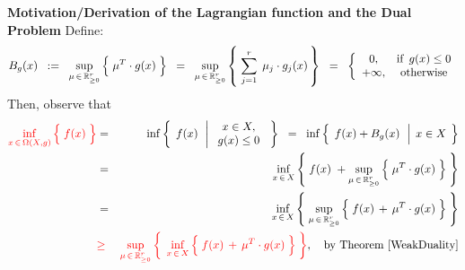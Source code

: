 \vskip 0.3cm
\noindent
\textbf{Motivation/Derivation of the Lagrangian function and the Dual Problem}
\vskip 0.2cm
\noindent
Define:
\begin{equation*}
B_{g}(x)
\;\; := \;\;
	\underset{\mu\,\in\,\Re_{\geq 0}^{r}}{\sup}
	\left\{\;
		\mu^{T} \cdot \overset{{\color{white}.}}{g(x)}
		\;\right\}
\;\; = \;\;
	\underset{\mu\,\in\,\Re_{\geq 0}^{r}}{\sup}
	\left\{\;
		\overset{r}{\underset{j=1}{\sum}}\;\,\mu_{j} \cdot \overset{{\color{white}.}}{g_{j}(x)}
		\,\right\}
\;\; = \;\;
	\left\{\begin{array}{cc}
		0, & \textnormal{if \,$g(x) \leq 0$}
		\\
		+\infty, & \textnormal{otherwise}
		\end{array}\right.
\end{equation*}
Then, observe that
\begin{eqnarray*}
{\color{red}\underset{x\,\in\,\Omega(X,g)}{\inf}\left\{\;
	\overset{{\color{white}.}}{f(x)}
	\;\right\}}
& = &
	\inf
	\left\{\;\,
		\overset{{\color{white}.}}{f(x)}
		\,\;\left\vert\;
		\begin{array}{c}
			x \in X,
			\\
			g(x) \leq 0
			\end{array}
			\right.
		\;\right\}
\;\; = \;\;
	\inf
	\left\{\;\,
		\overset{{\color{white}.}}{f(x)} + B_{g}(x)
		\,\;\left\vert\;\,
			\overset{{\color{white}1}}{x} \in X
			\right.
		\;\right\}
\\
& = &
	\underset{x\,\in\,X}{\inf}
	\left\{\;
		\overset{{\color{white}.}}{f(x)}
		\; +  
		\underset{\mu\,\in\,\Re_{\geq 0}^{r}}{\sup}
			\left\{\;
			\mu^{T} \cdot \overset{{\color{white}.}}{g(x)}
			\;\right\}
		\;\right\}
\\
& = &
	\underset{x\,\in\,X}{\inf}
	\left\{\;
		 \underset{\mu\,\in\,\Re_{\geq 0}^{r}}{\sup}
			\left\{\;
			\overset{{\color{white}.}}{f(x)}
			\, + \,
			\mu^{T} \cdot \overset{{\color{white}.}}{g(x)}
			\;\right\}
		\;\right\}
\\
& {\color{red}\geq} &
	{\color{red}\underset{\mu\,\in\,\Re_{\geq 0}^{r}}{\sup}
	\left\{\;\,
		\underset{x\,\in\,X}{\inf}
			\left\{\;
			\overset{{\color{white}.}}{f(x)}
			\, + \,
			\mu^{T} \cdot \overset{{\color{white}.}}{g(x)}
			\;\right\}
		\;\right\}},
		\quad
		\textnormal{by Theorem \ref{WeakDuality}}
\end{eqnarray*}


